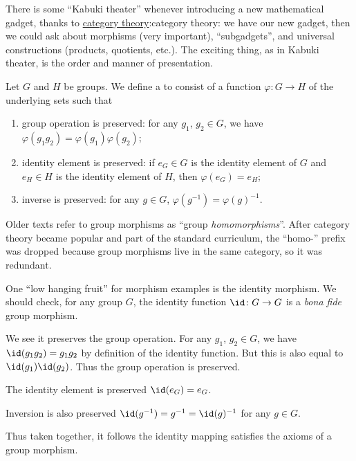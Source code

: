 \M
There is some ``Kabuki theater'' whenever introducing a new mathematical
gadget, thanks to \ifblog\href{https://texnicalstuff.blogspot.com/2009/08/object-oriented-math-category-theory-as.html}{category theory}:\fi\iftex category theory:\fi
we have our new gadget, then we could ask about morphisms (very
important), ``subgadgets'', and universal constructions (products,
quotients, etc.). The exciting thing, as in Kabuki theater, is the order
and manner of presentation.

\begin{definition}
  Let $G$ and $H$ be groups. We define a  to
  consist of a function $\varphi\colon G\to H$ of the underlying sets
  such that
  \begin{enumerate}
  \item group operation is preserved: for any $g_{1}$, $g_{2}\in G$, we have $\varphi(g_{1}g_{2})=\varphi(g_{1})\varphi(g_{2})$;
  \item identity element is preserved: if $e_{G}\in G$ is the identity
    element of $G$ and $e_{H}\in H$ is the identity element of $H$, then $\varphi(e_{G})=e_{H}$;
  \item inverse is preserved: for any $g\in G$, $\varphi(g^{-1})=\varphi(g)^{-1}$.
  \end{enumerate}
\end{definition}

\begin{remark}
  Older texts refer to group morphisms as ``group
  \emph{homomorphisms}''.
  After category theory became popular and part of the standard
  curriculum, the ``homo-'' prefix was dropped because group morphisms
  live in the same category, so it was redundant.
\end{remark}

\begin{example}
  One ``low hanging fruit'' for morphism examples is the identity
  morphism. We should check, for any group $G$, the identity function
  $\id\colon G\to G$ is a \emph{bona fide} group morphism.

  We see it preserves the group operation. For any $g_{1}$, $g_{2}\in G$,
  we have $\id(g_{1}g_{2})=g_{1}g_{2}$ by definition of the identity
  function. But this is also equal to $\id(g_{1})\id(g_{2})$. Thus the
  group operation is preserved.

  The identity element is preserved $\id(e_{G})=e_{G}$.

  Inversion is also preserved $\id(g^{-1})=g^{-1}=\id(g)^{-1}$ for any
  $g\in G$.

  Thus taken together, it follows the identity mapping satisfies the
  axioms of a group morphism.
\end{example}

